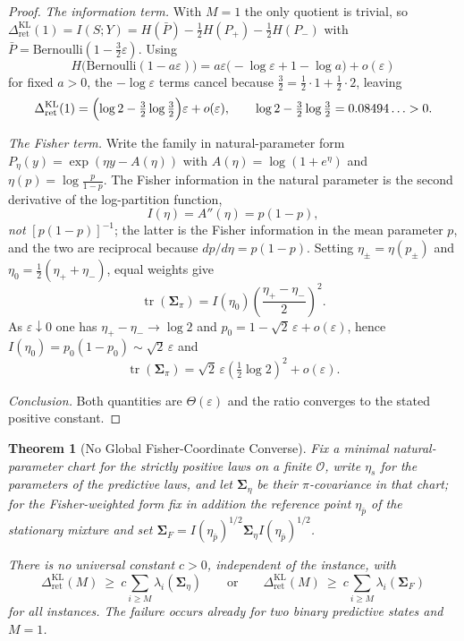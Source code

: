 \documentclass[12pt]{article}
\newtheorem{theorem}{Theorem}[section]
\theoremstyle{definition}
\DeclareMathOperator{\tr}{tr}
\newcommand{\RetKL}{\Delta_{\mathrm{ret}}^{\mathrm{KL}}}
\begin{document}
\begin{proof}
\emph{The information term.}  With $M=1$ the only quotient is trivial, so
$\RetKL(1)=I(S;Y)=H(\bar P)-\tfrac12H(P_+)-\tfrac12H(P_-)$ with
$\bar P=\mathrm{Bernoulli}(1-\tfrac32\varepsilon)$.  Using
\[
H\bigl(\mathrm{Bernoulli}(1-a\varepsilon)\bigr)
=
a\varepsilon\bigl(-\log\varepsilon+1-\log a\bigr)+o(\varepsilon)
\]
for fixed $a>0$, the $-\log\varepsilon$ terms cancel because
$\tfrac32=\tfrac12\cdot1+\tfrac12\cdot2$, leaving
\[
\RetKL(1)
=
\Bigl(\log2-\tfrac32\log\tfrac32\Bigr)\varepsilon+o(\varepsilon),
\qquad
\log2-\tfrac32\log\tfrac32=0.08494\ldots>0 .
\]

\emph{The Fisher term.}  Write the family in natural-parameter form
$P_\eta(y)=\exp(\eta y-A(\eta))$ with $A(\eta)=\log(1+e^\eta)$ and
$\eta(p)=\log\frac{p}{1-p}$.  The Fisher information in the natural parameter
is the second derivative of the log-partition function,
\[
I(\eta)=A''(\eta)=p(1-p),
\]
\emph{not} $[p(1-p)]^{-1}$; the latter is the Fisher information in the mean
parameter $p$, and the two are reciprocal because $dp/d\eta=p(1-p)$.  Setting
$\eta_\pm=\eta(p_\pm)$ and $\eta_0=\tfrac12(\eta_++\eta_-)$, equal weights give
\[
\tr(\bm{\Sigma}_\pi)
=
I(\eta_0)\left(\frac{\eta_+-\eta_-}{2}\right)^{2}.
\]
As $\varepsilon\downarrow0$ one has $\eta_+-\eta_-\to\log2$ and
$p_0=1-\sqrt2\,\varepsilon+o(\varepsilon)$, hence
$I(\eta_0)=p_0(1-p_0)\sim\sqrt2\,\varepsilon$ and
\[
\tr(\bm{\Sigma}_\pi)
=
\sqrt2\,\varepsilon\left(\tfrac12\log2\right)^{2}+o(\varepsilon).
\]

\emph{Conclusion.}  Both quantities are $\Theta(\varepsilon)$ and the ratio
converges to the stated positive constant.
\end{proof}

\begin{theorem}[No Global Fisher-Coordinate Converse]
\label{thm:no-global-fisher-converse}
Fix a minimal natural-parameter chart for the strictly positive laws on a
finite $\mathcal O$, write $\eta_s$ for the parameters of the predictive laws,
and let $\bm{\Sigma}_\eta$ be their $\pi$-covariance in that chart; for the
Fisher-weighted form fix in addition the reference point $\eta_{\bar p}$ of the
stationary mixture and set
$\bm{\Sigma}_F=I(\eta_{\bar p})^{1/2}\bm{\Sigma}_\eta I(\eta_{\bar p})^{1/2}$.

There is \emph{no} universal constant $c>0$, independent of the instance, with
\[
\RetKL(M)\ \ge\ c\sum_{i\ge M}\lambda_i(\bm{\Sigma}_\eta)
\qquad\text{or}\qquad
\RetKL(M)\ \ge\ c\sum_{i\ge M}\lambda_i(\bm{\Sigma}_F)
\]
for all instances.  The failure occurs already for two binary predictive states
and $M=1$.
\end{theorem}
\end{document}
